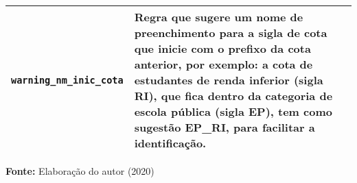 \begin{table}[ht]
\begin{tabular}{|p{6cm}|p{9cm}|}
\texttt{warning\_nm\_inic\_cota}          & Regra que sugere um nome de preenchimento para a sigla de cota que inicie com o prefixo da cota anterior, por exemplo: a cota de estudantes de renda inferior (sigla RI), que fica dentro da categoria de escola pública (sigla EP), tem como sugestão EP\_RI, para facilitar a identificação.
\\ \hline

\end{tabular}

  \par\medskip\textbf{Fonte:} Elaboração do autor (2020) \par\medskip
\end{table}
